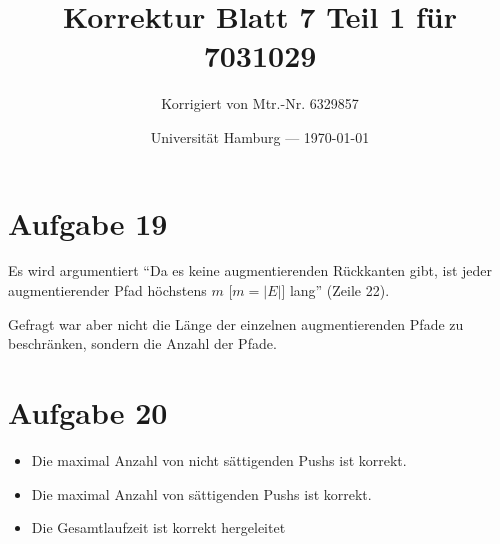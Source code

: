 \documentclass[parskip=half,a4paper]{scrartcl}
\title{Korrektur Blatt 7 Teil 1 für 7031029}
\author{Korrigiert von Mtr.-Nr. 6329857}
\date{Universität Hamburg --- \today}
\begin{document}
\maketitle %


\section{Aufgabe 19}

Es wird argumentiert \enquote{Da es keine augmentierenden Rückkanten gibt, ist jeder augmentierender Pfad höchstens $m$ [$m=|E|$] lang} (Zeile 22).

Gefragt war aber nicht die Länge der einzelnen augmentierenden Pfade zu beschränken, sondern die Anzahl der Pfade.

\section{Aufgabe 20}

\begin{itemize}
    \item Die maximal Anzahl von nicht sättigenden Pushs ist korrekt.
    \item Die maximal Anzahl von sättigenden Pushs ist korrekt.
    \item Die Gesamtlaufzeit ist korrekt hergeleitet
\end{itemize}
\end{document}
